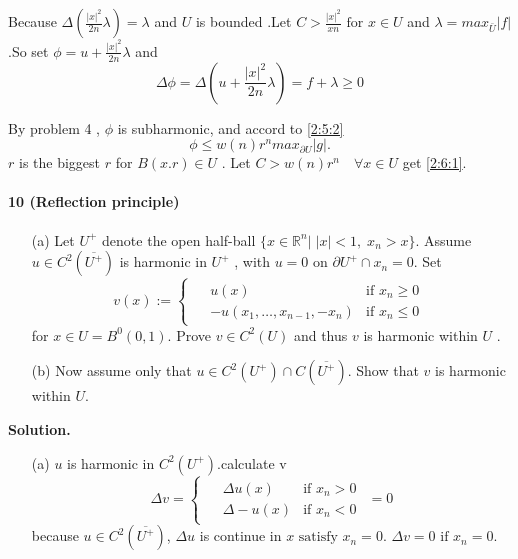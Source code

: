 \message{ !name(21935004-\unexpanded{谭焱}-homework2.tex)}\documentclass[a4paper]{book}
\newenvironment{solution}%
{\noindent\textbf{Solution.}}%
{\qedhere}
\numberwithin{equation}{chapter}
\theoremstyle{definition}
\begin{document}
\begin{multicols}{2}
Because $\Delta (\frac{|x|^2}{2n}\lambda) = \lambda $ and $U$ is bounded .Let $C > \frac{|x|^2}{xn} \text{ for }x \in U$ and $\lambda = max_{\bar{U}} |f|$ .So set $\phi = u + \frac{|x|^2}{2n} \lambda$ and 
\begin{equation}
	\Delta \phi = \Delta (u + \frac{|x|^2}{2n} \lambda) = f + \lambda \geq 0
\end{equation}

By problem 4 , $\phi$ is subharmonic, and accord to \ref{2:5:2}
\begin{equation}
	\phi \leq w(n)r^n max_{\partial U} |g|.
\end{equation}
$r$ is the biggest $r$ for $ B(x.r) \in U$ . Let $C > w(n)r^n \quad \forall x \in U$ get \ref{2:6:1}.


\paragraph{10 (Reflection principle)}
\begin{itemize}
	\item[(a)] Let $U^+$ denote the open half-ball $ \{x \in \mathbb{R}^n | \; |x| < 1,\; x_n > x\} $. Assume $u \in C^2(\overline{U^+})$ is harmonic in $U^+$ , with $u = 0$ on $ \partial U^+ \cap {x_n = 0}$. Set
	\begin{equation}\label{2:10:1}
	v(x) := 
		\begin{cases}
			\begin{aligned}
              &u(x)         &\text{if } x_n \geq 0\\
              &-u(x_1, \ldots ,x_{n-1}, -x_n)  & \text{if } x_n \le 0
			\end{aligned}
		\end{cases}
	\end{equation}
	for $x \in U = B^0(0,1)$. Prove $v \in C^2(U)$ and thus $v$ is harmonic within $U$ .
	
	\item[(b)]Now assume only that $u \in C^2(U^+)\cap C(\overline{U^+})$. Show that $v$ is harmonic within $U$. 
\end{itemize}

\begin{solution}
\begin{itemize}
	\item[(a)]$u$ is harmonic in $C^2(U^+)$.calculate v 
	\begin{equation}
		\Delta v =
		\begin{cases}
		\begin{aligned}
		&\Delta u(x)  &\text{if } x_n > 0 \\
		&\Delta -u(x)  &\text{if } x_n < 0
		\end{aligned}
		\end{cases}
		= 0
	\end{equation}
	because $u \in C^2(\overline{U^+})$, $\Delta u$ is continue in $x \text{ satisfy } x_n = 0$. $\Delta v = 0  \text{ if } x_n = 0$.
	

\end{itemize}
\end{solution}
\end{multicols}
\end{document}
